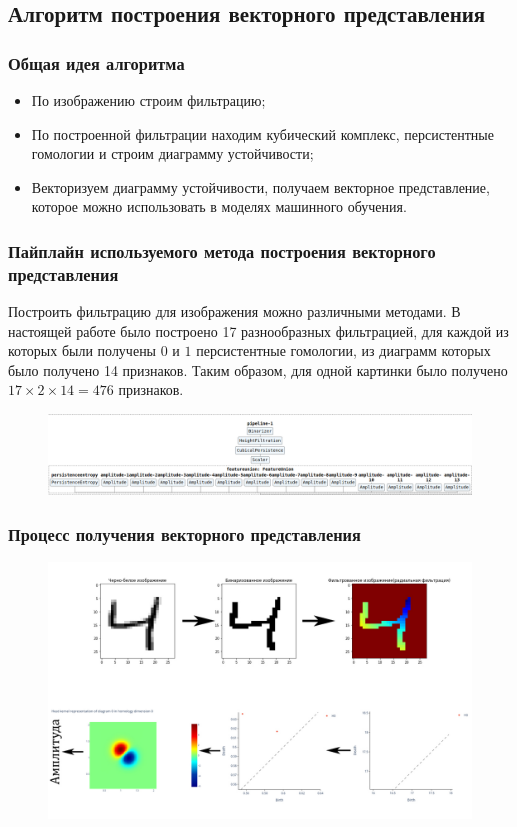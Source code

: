 \documentclass{beamer}
\begin{document}
		\subsection{Алгоритм построения векторного представления}
		\begin{frame}
			\frametitle{Общая идея алгоритма}
			\begin{itemize}
				\item По изображению строим фильтрацию;
				\item По построенной фильтрации находим кубический комплекс, персистентные гомологии и строим диаграмму устойчивости;
				\item Векторизуем диаграмму устойчивости, получаем векторное представление, которое можно использовать в моделях машинного обучения.
			\end{itemize}
		\end{frame}
		\begin{frame}
			\frametitle{Пайплайн используемого метода построения векторного представления}
			Построить фильтрацию для изображения можно различными методами. В настоящей работе было построено 17 разнообразных фильтрацией, для каждой из которых были получены $0$ и $1$ персистентные гомологии, из диаграмм которых было получено 14 признаков. Таким образом, для одной картинки было получено $17 \times 2 \times 14 = 476$ признаков.
			\begin{figure}
				\centering
				\includegraphics[width=\linewidth]{pipelineDiagram.png}
			\end{figure}
		\end{frame}
		\begin{frame}
			\frametitle{Процесс получения векторного представления}
			\begin{figure}
				\centering
				\includegraphics[width=\linewidth]{pipe.jpg}
			\end{figure}
		\end{frame}
\end{document}
